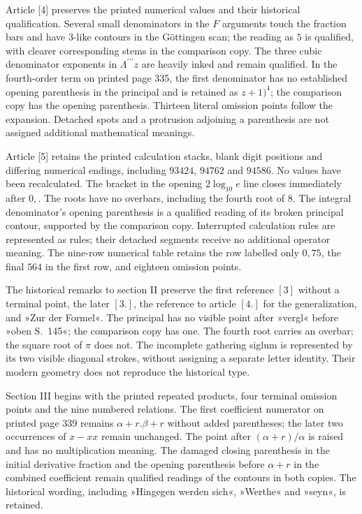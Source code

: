 \par Article [4] preserves the printed numerical values and their historical qualification. Several small denominators in the $F$ arguments touch the fraction bars and have $3$-like contours in the Göttingen scan; the reading as $5$ is qualified, with clearer corresponding stems in the comparison copy. The three cubic denominator exponents in $\Lambda^{\prime\prime\prime}z$ are heavily inked and remain qualified. In the fourth-order term on printed page 335, the first denominator has no established opening parenthesis in the principal and is retained as $z+1)^4$; the comparison copy has the opening parenthesis. Thirteen literal omission points follow the expansion. Detached spots and a protrusion adjoining a parenthesis are not assigned additional mathematical meanings.

\par Article [5] retains the printed calculation stacks, blank digit positions and differing numerical endings, including $93424$, $94762$ and $94586$. No values have been recalculated. The bracket in the opening $2\log_{10}e$ line closes immediately after $0,$. The roots have no overbars, including the fourth root of $8$. The integral denominator’s opening parenthesis is a qualified reading of its broken principal contour, supported by the comparison copy. Interrupted calculation rules are represented as rules; their detached segments receive no additional operator meaning. The nine-row numerical table retains the row labelled only $0{,}75$, the final $564$ in the first row, and eighteen omission points.

\par The historical remarks to section II preserve the first reference $[3]$ without a terminal point, the later $[3.]$, the reference to article $[4.]$ for the generalization, and »Zur der Formel«. The principal has no visible point after »vergl« before »oben S.~145«; the comparison copy has one. The fourth root carries an overbar; the square root of $\pi$ does not. The incomplete gathering siglum is represented by its two visible diagonal strokes, without assigning a separate letter identity. Their modern geometry does not reproduce the historical type.

\par Section III begins with the printed repeated products, four terminal omission points and the nine numbered relations. The first coefficient numerator on printed page 339 remains $\alpha+r.\beta+r$ without added parentheses; the later two occurrences of $x-xx$ remain unchanged. The point after $(\alpha+r)/\alpha$ is raised and has no multiplication meaning. The damaged closing parenthesis in the initial derivative fraction and the opening parenthesis before $\alpha+r$ in the combined coefficient remain qualified readings of the contours in both copies. The historical wording, including »Hingegen werden sich«, »Werthe« and »seyn«, is retained.


